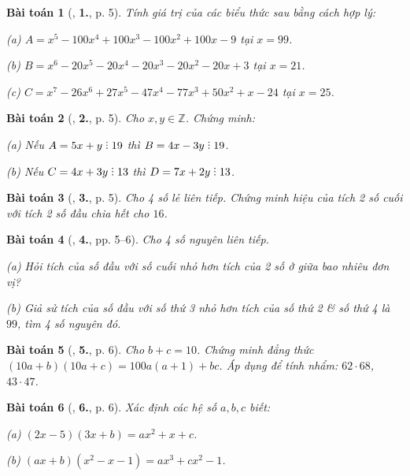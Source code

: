 \documentclass{article}
\numberwithin{equation}{section}
\newtheorem{baitoan}{Bài toán}
\DeclareRobustCommand{\divby}{%
	\mathrel{\vbox{\baselineskip.65ex\lineskiplimit0pt\hbox{.}\hbox{.}\hbox{.}}}%
}
\begin{document}
\begin{baitoan}[\cite{Tuyen_Toan_8}, \textbf{1.}, p. 5]
	Tính giá trị của các biểu thức sau bằng cách hợp lý:\\
	\begin{enumerate*}
		\item[(a)] $A = x^5 - 100x^4 + 100x^3 - 100x^2 + 100x - 9$ tại $x = 99$.
		\item[(b)] $B = x^6 - 20x^5 - 20x^4 - 20x^3 - 20x^2 - 20x + 3$ tại $x  = 21$.
		\item[(c)] $C = x^7 - 26x^6 + 27x^5 - 47x^4 - 77x^3 + 50x^2 + x - 24$ tại $x = 25$.
	\end{enumerate*}
\end{baitoan}

\begin{baitoan}[\cite{Tuyen_Toan_8}, \textbf{2.}, p. 5]
	Cho $x,y\in\mathbb{Z}$. Chứng minh:
	\begin{enumerate*}
		\item[(a)] Nếu $A = 5x + y\divby19$ thì $B = 4x - 3y\divby19$.
		\item[(b)] Nếu $C = 4x + 3y\divby13$ thì $D = 7x + 2y\divby13$.
	\end{enumerate*}
\end{baitoan}

\begin{baitoan}[\cite{Tuyen_Toan_8}, \textbf{3.}, p. 5]
	Cho 4 số lẻ liên tiếp. Chứng minh hiệu của tích 2 số cuối với tích 2 số đầu chia hết cho $16$.
\end{baitoan}

\begin{baitoan}[\cite{Tuyen_Toan_8}, \textbf{4.}, pp. 5--6]
	Cho 4 số nguyên liên tiếp.
	\begin{enumerate*}
		\item[(a)] Hỏi tích của số đầu với số cuối nhỏ hơn tích của 2 số ở giữa bao nhiêu đơn vị?
		\item[(b)] Giả sử tích của số đầu với số thứ 3 nhỏ hơn tích của số thứ 2 \& số thứ 4 là $99$, tìm 4 số nguyên đó.
	\end{enumerate*}
\end{baitoan}

\begin{baitoan}[\cite{Tuyen_Toan_8}, \textbf{5.}, p. 6]
	Cho $b + c = 10$. Chứng minh đẳng thức $(10a + b)(10a + c) = 100a(a + 1) + bc$. Áp dụng để tính nhẩm: $62\cdot68$, $43\cdot47$.
\end{baitoan}

\begin{baitoan}[\cite{Tuyen_Toan_8}, \textbf{6.}, p. 6]
	Xác định các hệ số $a,b,c$ biết:
	\begin{enumerate*}
		\item[(a)] $(2x - 5)(3x + b) = ax^2 + x + c$.\\
		\item[(b)] $(ax + b)(x^2 - x - 1) = ax^3 + cx^2 - 1$.
	\end{enumerate*}
\end{baitoan}
\end{document}
